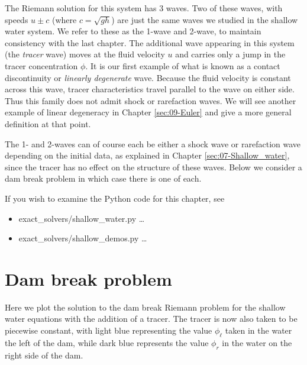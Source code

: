 \documentclass{SIAMbook2016}
\providecommand{\tightlist}{%
      \setlength{\itemsep}{0pt}\setlength{\parskip}{0pt}}
\begin{document}
The Riemann solution for this system has 3 waves. Two of these waves,
with speeds \(u\pm c\) (where \(c=\sqrt{gh}\)) are just the same waves
we studied in the shallow water system. We refer to these as the 1-wave
and 2-wave, to maintain consistency with the last chapter. The
additional wave appearing in this system (the \emph{tracer} wave) moves
at the fluid velocity \(u\) and carries only a jump in the tracer
concentration \(\phi\). It is our first example of what is known as a
contact discontinuity or \emph{linearly degenerate} wave. Because the
fluid velocity is constant across this wave, tracer characteristics
travel parallel to the wave on either side. Thus this family does not
admit shock or rarefaction waves. We will see another example of linear
degeneracy in Chapter \ref{sec:09-Euler} and give a more general
definition at that point.

The 1- and 2-waves can of course each be either a shock wave or
rarefaction wave depending on the initial data, as explained in
Chapter \ref{sec:07-Shallow_water}, since the tracer has no effect on
the structure of these waves. Below we consider a dam break problem in
which case there is one of each.

If you wish to examine the Python code for this chapter, see

\begin{itemize}
\tightlist
\item
  {exact\_solvers/shallow\_water.py} \ldots{}
\item
  {exact\_solvers/shallow\_demos.py} \ldots{}
\end{itemize}

\hypertarget{dam-break-problem}{%
\section{Dam break problem}\label{dam-break-problem}}

Here we plot the solution to the dam break Riemann problem for the
shallow water equations with the addition of a tracer. The tracer is now
also taken to be piecewise constant, with light blue representing the
value \(\phi_\ell\) taken in the water the left of the dam, while dark
blue represents the value \(\phi_r\) in the water on the right side of
the dam.
\end{document}
